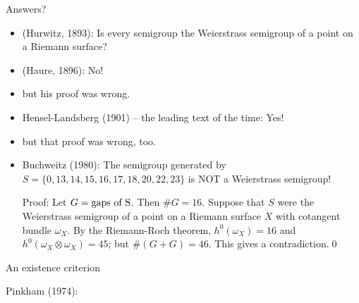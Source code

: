 \documentclass[12pt, aspectratio=169]{beamer}
\begin{document}
\begin{frame}{Answers?}
 
\begin{itemize}
 \item<1-6> (Hurwitz, 1893): Is every semigroup the Weierstrass semigroup of a point
on a Riemann surface?
\item <2-6> \qquad (Haure, 1896): No!
\item<3-6> \qquad\qquad but his proof was wrong.
\item<4-6> \qquad Hensel-Landsberg (1901) -- the leading text of the time: Yes!
\item<5-6> \qquad\qquad but that proof was wrong, too.
\item<6> \qquad Buchweitz (1980): The semigroup generated by
$S = \{0, 13, 14, 15, 16, 17, 18, 20, 22, 23\} $ is NOT a Weierstrass semigroup! 
\smallskip

Proof: Let $G= \hbox{gaps of S}$. Then $\#G = 16$. Suppose that $S$ were the Weierstrass semigroup
of a point on a Riemann surface $X$ with cotangent bundle $\omega_X$. By the Riemann-Roch theorem,
$h^0(\omega_X) = 16$ and $h^0(\omega_X\otimes \omega_X) = 45$; but $\#(G+G) = 46$. This gives a  contradiction.\qed
\end{itemize}

\end{frame}

\begin{frame}{An existence criterion}

Pinkham (1974): 

 
\end{frame}
\end{document}
